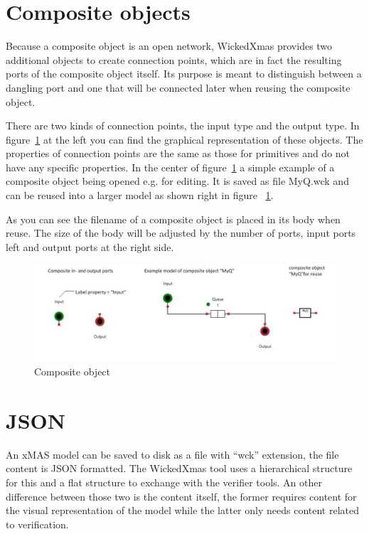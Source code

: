 \documentclass[a4paper,11pt,final]{article}
\begin{document}
\section{Composite objects}
Because a composite object is an open network, WickedXmas provides two
additional objects to create connection points, which are in fact the resulting
ports of the composite object itself. Its purpose is meant to distinguish between a
dangling port and one that will be connected later when reusing the
composite object.

There are two kinds of connection points, the input type and the output type.
In figure~\ref{fig:CompObj} at the left you can find the graphical
representation of these objects. The properties of connection points are
the same as those for primitives and do not have any specific properties.
In the center of figure~\ref{fig:CompObj} a simple example of a
composite object being opened e.g. for editing. It is saved as file MyQ.wck
and can be reused into a larger model as shown right in figure ~\ref{fig:CompObj}.

As you can see the filename of a composite object is placed in its
body when reuse. The size of the body will be adjusted by the number
of ports, input ports left and output ports at the right side.


\begin{figure}[here]
\includegraphics[width=1.0\textwidth]{CompObj}
\caption{Composite object}
\label{fig:CompObj}
\end{figure}


\newpage
\section{JSON}

An xMAS model  can be saved to disk as a file with ``wck'' extension, the file content is JSON formatted.
The WickedXmas tool uses a hierarchical structure for this and a flat structure to exchange with the verifier
tools.
An other difference between those two is the content itself, the former requires content for the
visual representation of the model while the latter only needs content related to verification.
\end{document}
